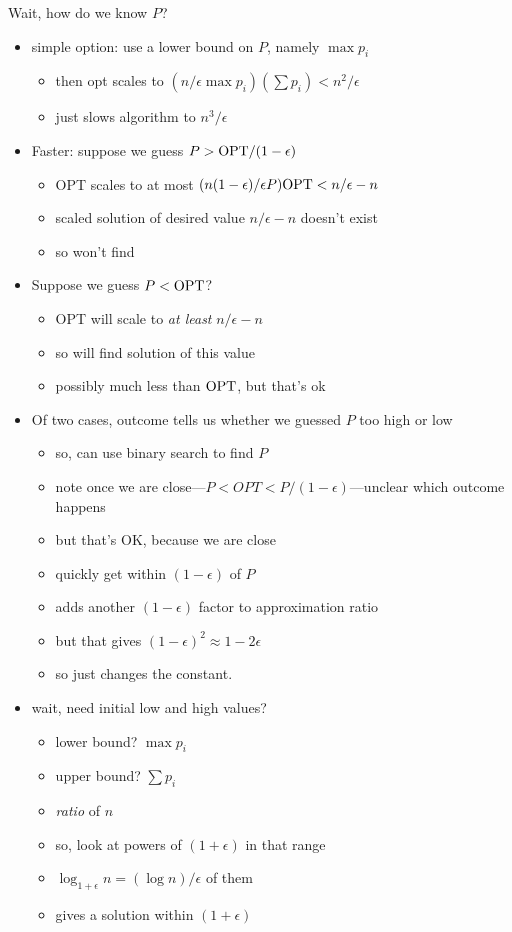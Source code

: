 \documentclass{article}
\begin{document}
Wait, how do we know $P$?
\begin{itemize}
\item simple option: use a lower bound on $P$, namely $\max p_i$
  \begin{itemize}
  \item then opt scales to $(n/\epsilon \max p_i)(\sum p_i) < n^2/\epsilon$
  \item just slows algorithm to $n^3/\epsilon$
  \end{itemize}
\item Faster: suppose we guess $P>{\mbox{OPT}}/(1-\epsilon)$
  \begin{itemize}
    \item OPT scales to at most $(n(1-\epsilon)/\epsilon P){\mbox{OPT}} < n/\epsilon-n$
    \item scaled solution of desired value $n/\epsilon-n$ doesn't exist
    \item so won't find
  \end{itemize}
\item Suppose we guess $P<{\mbox{OPT}}$?
  \begin{itemize}
  \item OPT will scale to \emph{at least} $n/\epsilon-n$
  \item so will find solution of this value
  \item possibly much less than ${\mbox{OPT}}$, but that's ok
  \end{itemize}
\item Of two cases, outcome tells us whether we guessed $P$ too high
  or low
\begin{itemize}
\item so, can use binary search to find $P$
\item note once we are close---$P<OPT<P/(1-\epsilon)$---unclear which outcome happens
\item but that's OK, because we are close
\item quickly get within $(1-\epsilon)$ of $P$
\item adds another $(1-\epsilon)$ factor to approximation ratio
\item but that gives $(1-\epsilon)^2 \approx 1-2\epsilon$
\item so just changes the constant.
\end{itemize}  
\item wait, need initial low and high values?
\begin{itemize}
\item lower bound?  $\max p_i$
\item upper bound? $\sum p_i$
\item \emph{ratio} of $n$
\item so, look at powers of $(1+\epsilon)$ in that range
\item $\log_{1+\epsilon}n = (\log n)/\epsilon$ of them
\item gives a solution within $(1+\epsilon)$
\end{itemize}
\end{itemize}
\end{document}
